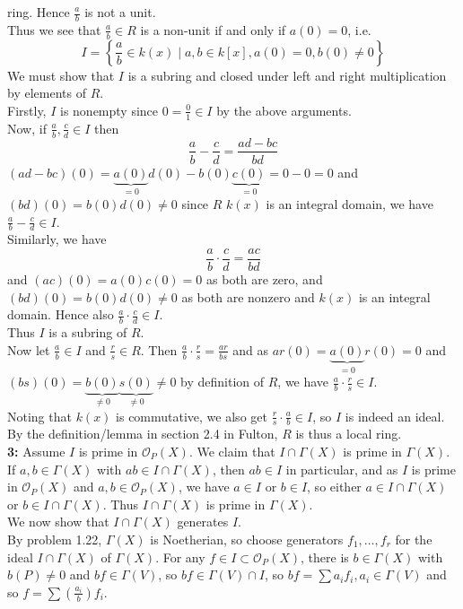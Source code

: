 \documentclass[a4paper]{article}
\begin{document}
ring. Hence $\frac{a}{b}$ is not a unit.\\
Thus we see that $\frac{a}{b} \in R$ is a non-unit if and only if $a(0) = 0$, i.e.
\[
I = \left\{ \frac{a}{b} \in k(x)  \mid a,b \in k\left[ x \right] , a(0) = 0,
b(0)\neq 0 \right\} 
\] 
We must show that $I$ is a subring and closed under left and right
multiplication by elements of $R$.\\
Firstly, $I$ is nonempty since $0=\frac{0}{1} \in I$ by the above arguments.\\
Now, if $\frac{a}{b},\frac{c}{d} \in I$ then
\[
\frac{a}{b} - \frac{c}{d} = \frac{ad - bc}{bd}
\] 
$(ad-bc)(0) = \underbrace{a(0)}_{=0} d(0) - b(0) \underbrace{c(0)}_{=0} = 0-0 = 0$ and $(bd)(0) = b(0) d(0) \neq 0$
since $R$ $k(x)$ is an integral domain, we have
$\frac{a}{b} - \frac{c}{d} \in I$.\\
Similarly, we have 
\[
\frac{a}{b} \cdot \frac{c}{d} = \frac{ac}{bd}
\] 
and $(ac)(0) = a(0) c(0) = 0$ as both are  zero, and $(bd) (0) = b(0) d(0) \neq
0$ as both are nonzero and $k(x)$ is an integral domain. Hence also
$\frac{a}{b} \cdot \frac{c}{d} \in I$.\\
Thus $I$ is a subring of $R$.\\
\linebreak
Now let $\frac{a}{b} \in I$ and $\frac{r}{s} \in R$. Then
$\frac{a}{b} \cdot \frac{r}{s} = \frac{ar}{bs}$ and
as $ar(0) = \underbrace{a(0)}_{=0} r(0) = 0$ and
$(bs)(0)= \underbrace{b(0)}_{\neq 0} \underbrace{s(0)}_{\neq 0} \neq 0$ by
definition of $R$, we have
$\frac{a}{b} \cdot \frac{r}{s} \in I$.\\
Noting that $k (x) $ is commutative, we also get
$\frac{r}{s} \cdot \frac{a}{b} \in I$, so $I$ is indeed an ideal. By the
definition/lemma
in section 2.4 in Fulton, $R$ is thus a local ring.\\
\linebreak
\textbf{3:} Assume $I$ is prime in $\mathcal{O}_P (X)$.
We claim that $I \cap \Gamma(X)$ is prime in $\Gamma(X)$.\\
If $a,b \in \Gamma(X)$ with $ab \in I \cap \Gamma(X)$, then $ab \in I$ in particular, and as $I$ is
prime
in  $\mathcal{O}_P (X)$ and $a,b \in \mathcal{O}_P(X)$, we have
$a \in I$ or $b \in I$, so either
$a \in I \cap \Gamma(X)$ or $b \in I \cap \Gamma(X)$. Thus
$I \cap \Gamma(X)$ is prime in $\Gamma(X)$.\\
\linebreak
We now show that $I \cap \Gamma(X)$ generates $I$.\\
By problem 1.22, $\Gamma(X)$ is Noetherian, so choose generators
$f_1, \ldots, f_r$ for the ideal $I \cap \Gamma(X)$ of $\Gamma(X)$. 
For any $f \in I \subset \mathcal{O}_P(X)$, there is
$b \in \Gamma(X)$ with $b(P) \neq 0$ and $b f \in \Gamma(V)$, so
$bf \in \Gamma(V) \cap I$, so $bf = \sum a_i f_i, a_i \in \Gamma(V)$ and so
$f = \sum \left( \frac{a_i}{b} \right) f_i$.\\
\linebreak
\end{document}

